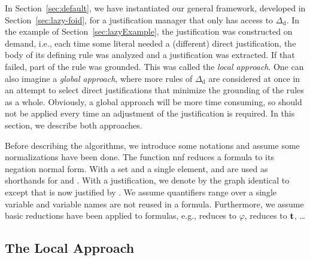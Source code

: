 \documentclass[11pt]{article}
\newcommand{\m}[1]{\ensuremath{#1}\xspace}
\newcommand{\trval}[1]{\m{{\bf #1}}}
\newcommand{\ltrue}{\trval{t}}
\newcommand{\D}{\m{\Delta}}
\newcommand{\f}{\m{\varphi}}
\theoremstyle{plain}
\theoremstyle{definition}
\theoremstyle{example_basic}
\theoremstyle{example_contd}
\theoremstyle{plain}
\newcommand{\Dd}{\ensuremath{\D_\text{d}}\xspace}
\newcommand{\change}[1]{#1}
\begin{document}
\newcommand{\red}{\color{red}}
\newcommand{\blue}{\color{blue}}
\newcommand{\green}{\color{green}}
\newcommand{\gray}{\color{gray}}
\newcommand{\black}{\color{black}}


\newcommand{\algfalse}{\ensuremath{\mathit{false}}\xspace}
\newcommand{\algundef}{\ensuremath{\mathit{undef}}\xspace}
\newcommand{\algtrue}{\ensuremath{\mathit{true}}\xspace}

In Section~\ref{sec:default}, we have instantiated our general framework, developed in Section~\ref{sec:lazy-foid}, for a justification manager that only has access to \Dd. In the example of Section~\ref{sec:lazyExample}, the justification was constructed on demand, i.e., each time some literal needed a (different) direct justification, the body of its defining rule was analyzed and a justification was extracted. If that failed, part of the rule was grounded. This was called the \emph{local approach}. One can also imagine a \emph{global approach}, where more rules of \Dd are considered at once in an attempt to select direct justifications that minimize the grounding of the rules as a whole. Obviously, a global approach will be more time consuming, so should not be applied every time an adjustment of the justification is required. In this section, we describe both approaches.

Before describing the algorithms, we introduce some notations and assume some normalizations have been done. The function \textsf{nnf} reduces a formula to its negation normal form. With  a set and  a single element,  and  are used as shorthands for  and . \change{With \jgraph a justification, we denote by  the graph identical to \jgraph except that  is now justified by .} We assume quantifiers range over a single variable and variable names are not reused in a formula. Furthermore, we assume basic reductions have been applied to formulas, e.g.,  reduces to \f,  reduces to \ltrue, \ldots


\subsection{The Local Approach}\label{sec:local}
\newcommand{\changes}{\ensuremath{q_{ch}}\xspace}
\end{document}

